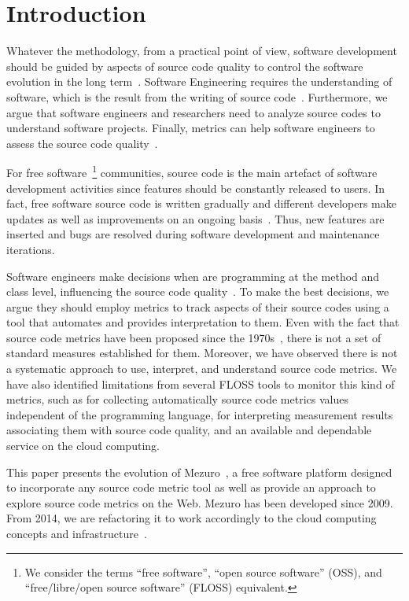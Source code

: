 \section{Introduction}
\label{introduction}

Whatever the methodology, from a practical point of view, software development
should be guided by aspects of source code quality to control the software evolution in the long
term~\cite{martin2008}. Software Engineering
requires the understanding of software, which is the result from the writing of
source code~\cite{martin2008}. Furthermore, we argue that software engineers and
researchers need to analyze source codes to understand software projects. Finally, metrics can help software
engineers to assess the source code quality~\cite{SEI88}.

For free software~\footnote{We consider the terms ``free software'', ``open
source software'' (OSS), and  ``free/libre/open source software'' (FLOSS)
equivalent.} communities, source code is the main artefact of software
development activities since features should be constantly released to users.
In fact, free software source code is written gradually and different
developers make updates as well as improvements on an ongoing
basis~\cite{martin2008}. Thus, new features are inserted and bugs are resolved
during software development and maintenance iterations.

Software engineers make decisions when are programming at the method and class
level, influencing the source code quality~\cite{beck2007}. To make the best
decisions, we argue they should employ metrics to track aspects of their source codes using a tool that automates and provides interpretation to them. Even with the fact that source code metrics have been proposed since the 1970s~\cite{SEI88}, there is
not a set of standard measures established for them.  Moreover, we have
observed there is not a systematic approach to use, interpret, and understand
source code metrics. We have also identified limitations from several FLOSS
tools to monitor this kind of metrics, such as for collecting automatically
source code metrics values independent of the programming language, for
interpreting measurement results associating them with source code quality, and
an available and dependable service on the cloud computing.

This paper presents the evolution of Mezuro~\cite{mezuro2012}, a free software
platform designed to incorporate any source code metric tool as well as provide
an approach to explore source code metrics on the Web. Mezuro has been
developed since 2009. From 2014, we are refactoring it to work accordingly to
the cloud computing concepts and infrastructure~\cite{louridas2010}.

